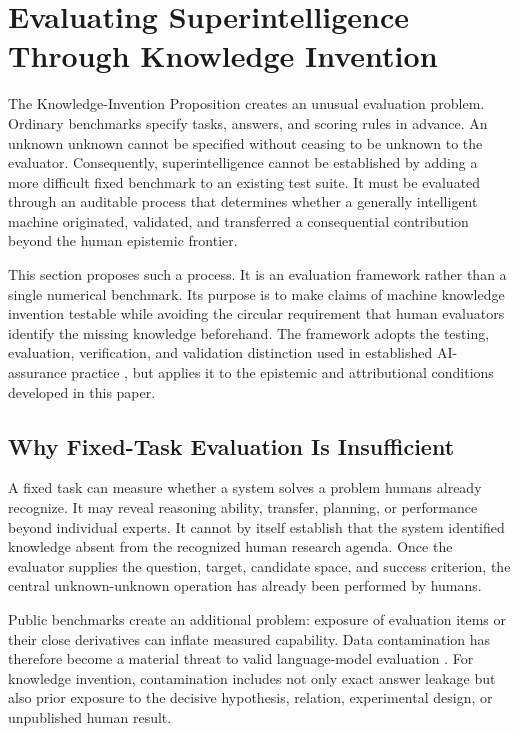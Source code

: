 \section{\textbf{Evaluating Superintelligence Through Knowledge Invention}}
\label{sec:evaluating_superintelligence}

The Knowledge-Invention Proposition creates an unusual evaluation problem.
Ordinary benchmarks specify tasks, answers, and scoring rules in advance. An
unknown unknown cannot be specified without ceasing to be unknown to the
evaluator. Consequently, superintelligence cannot be established by adding a
more difficult fixed benchmark to an existing test suite. It must be evaluated
through an auditable process that determines whether a generally intelligent
machine originated, validated, and transferred a consequential contribution
beyond the human epistemic frontier.

This section proposes such a process. It is an evaluation framework rather
than a single numerical benchmark. Its purpose is to make claims of machine
knowledge invention testable while avoiding the circular requirement that
human evaluators identify the missing knowledge beforehand. The framework
adopts the testing, evaluation, verification, and validation distinction used
in established AI-assurance practice \cite{tabassi2023airmf}, but applies it to
the epistemic and attributional conditions developed in this paper.

\subsection{\textbf{Why Fixed-Task Evaluation Is Insufficient}}

A fixed task can measure whether a system solves a problem humans already
recognize. It may reveal reasoning ability, transfer, planning, or performance
beyond individual experts. It cannot by itself establish that the system
identified knowledge absent from the recognized human research agenda. Once
the evaluator supplies the question, target, candidate space, and success
criterion, the central unknown-unknown operation has already been performed by
humans.

Public benchmarks create an additional problem: exposure of evaluation items
or their close derivatives can inflate measured capability. Data contamination
has therefore become a material threat to valid language-model evaluation
\cite{sainz2023contamination}. For knowledge invention, contamination includes
not only exact answer leakage but also prior exposure to the decisive
hypothesis, relation, experimental design, or unpublished human result.

